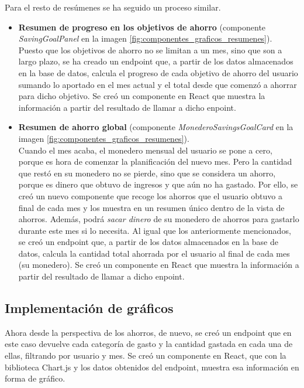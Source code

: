 Para el resto de resúmenes se ha seguido un proceso similar. 

\begin{itemize}
    \item \textbf{Resumen de progreso en los objetivos de ahorro} (componente \textit{SavingGoalPanel} en la imagen \ref{fig:componentes_graficos_resumenes}). \\
    Puesto que los objetivos de ahorro no se limitan a un mes, sino que son a largo plazo, se ha creado un endpoint que, a partir de los datos almacenados en la base de datos, calcula el progreso de cada objetivo de ahorro del usuario sumando lo aportado en el mes actual y el total desde que comenzó a ahorrar para dicho objetivo. Se creó un componente en React que muestra la información a partir del resultado de llamar a dicho enpoint.
    \item \textbf{Resumen de ahorro global} (componente \textit{MonederoSavingsGoalCard} en la imagen \ref{fig:componentes_graficos_resumenes}).\\
     Cuando el mes acaba, el monedero mensual del usuario se pone a cero, porque es hora de comenzar la planificación del nuevo mes. Pero la cantidad que restó en su monedero no se pierde, sino que se considera un ahorro, porque es dinero que obtuvo de ingresos y que aún no ha gastado. Por ello, se creó un nuevo componente que recoge los ahorros que el usuario obtuvo a final de cada mes y los muestra en un resumen único dentro de la vista de ahorros. Además, podrá \textit{sacar dinero} de su monedero de ahorros para gastarlo durante este mes si lo necesita. Al igual que los anteriormente mencionados, se creó un endpoint que, a partir de los datos almacenados en la base de datos, calcula la cantidad total ahorrada por el usuario al final de cada mes (su monedero). Se creó un componente en React que muestra la información a partir del resultado de llamar a dicho enpoint.

\end{itemize}


\subsection{Implementación de gráficos}
Ahora desde la perspectiva de los ahorros, de nuevo, se creó un endpoint que en este caso devuelve cada categoría de gasto y la cantidad gastada en cada una de ellas, filtrando por usuario y mes. Se creó un componente en React, que con la biblioteca Chart.js y los datos obtenidos del endpoint, muestra esa información en forma de gráfico.

